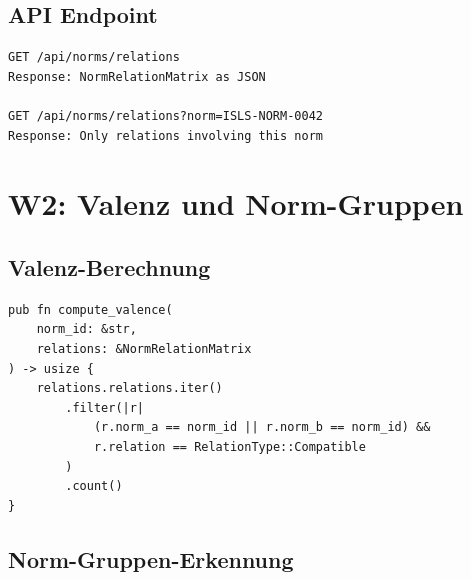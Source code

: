 \documentclass[11pt,a4paper]{article}
\begin{document}
\subsection{API Endpoint}

\begin{lstlisting}[style=bash]
GET /api/norms/relations
Response: NormRelationMatrix as JSON

GET /api/norms/relations?norm=ISLS-NORM-0042
Response: Only relations involving this norm
\end{lstlisting}

\section{W2: Valenz und Norm-Gruppen}
\label{sec:w2}

\subsection{Valenz-Berechnung}

\begin{lstlisting}[style=rust]
pub fn compute_valence(
    norm_id: &str,
    relations: &NormRelationMatrix
) -> usize {
    relations.relations.iter()
        .filter(|r| 
            (r.norm_a == norm_id || r.norm_b == norm_id) &&
            r.relation == RelationType::Compatible
        )
        .count()
}
\end{lstlisting}

\subsection{Norm-Gruppen-Erkennung}
\end{document}
